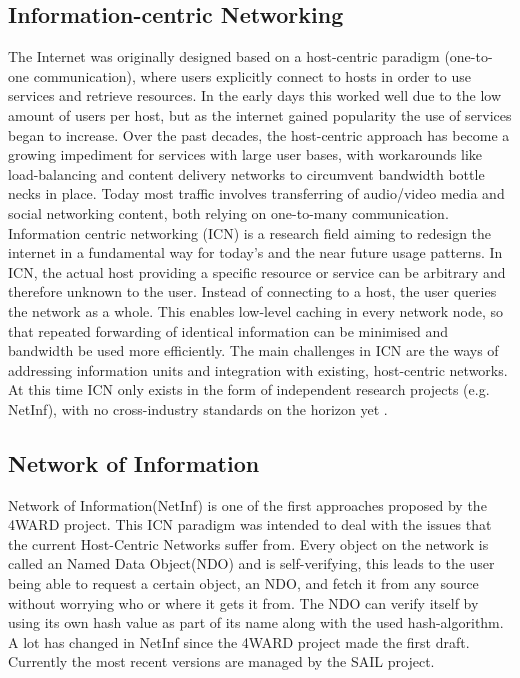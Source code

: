 \subsection{Information-centric Networking}
\label{sec:netinf}
The Internet was originally designed based on a host-centric paradigm (one-to-one communication), where users explicitly connect to hosts in order to use services and retrieve resources. In the early days this worked well due to the low amount of users per host, but as the internet gained popularity the use of services began to increase. Over the past decades, the host-centric approach has become a growing impediment for services with large user bases, with workarounds like load-balancing and content delivery networks to circumvent bandwidth bottle necks in place. Today most traffic involves transferring of audio/video media and social networking content, both relying on one-to-many communication. Information centric networking (ICN) is a research field aiming to redesign the internet in a fundamental way for today's and the near future usage patterns. In ICN, the actual host providing a specific resource or service can be arbitrary and therefore unknown to the user. Instead of connecting to a host, the user queries the network as a whole. This enables low-level caching in every network node, so that repeated forwarding of identical information can be minimised and bandwidth be used more efficiently. The main challenges in ICN are the ways of addressing information units and integration with existing, host-centric networks. At this time ICN only exists in the form of independent research projects (e.g. NetInf), with no cross-industry standards on the horizon yet \cite{ICNarticle}. 


\subsection{Network of Information}
Network of Information(NetInf) is one of the first approaches proposed by the 4WARD project. \cite{4ward} This ICN paradigm was intended to deal with the issues that the current Host-Centric Networks suffer from. Every object on the network is called an Named Data Object(NDO) and is self-verifying, this leads to the user being able to request a certain object, an NDO, and fetch it from any source without worrying who or where it gets it from. The NDO can verify itself by using its own hash value as part of its name along with the used hash-algorithm.
A lot has changed in NetInf since the 4WARD project made the first draft. Currently the most recent versions are managed by the SAIL project. \cite{netinfproto}

